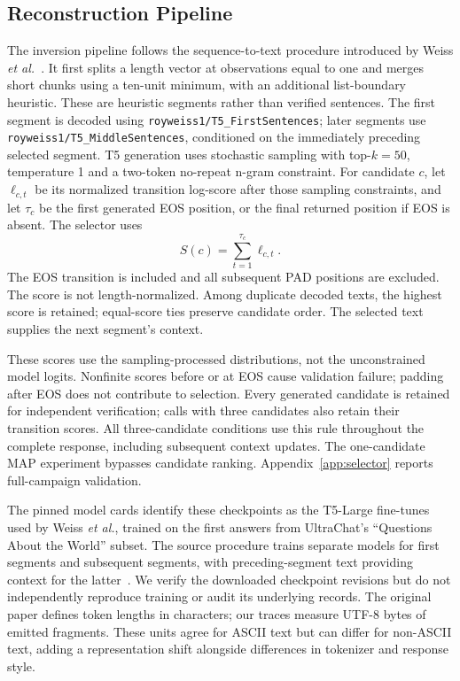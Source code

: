 \documentclass[electronics,article,submit,pdftex,moreauthors]{Definitions/mdpi}
\begin{document}
\subsection{Reconstruction Pipeline}\label{sec:reconstructor}
The inversion pipeline follows the sequence-to-text procedure introduced by Weiss \emph{et al.}~\cite{weiss2024prompt}. It first splits a length vector at observations equal to one and merges short chunks using a ten-unit minimum, with an additional list-boundary heuristic. These are heuristic segments rather than verified sentences. The first segment is decoded using \texttt{royweiss1/T5\_FirstSentences}; later segments use \texttt{royweiss1/T5\_MiddleSentences}, conditioned on the immediately preceding selected segment. T5 generation uses stochastic sampling with top-$k=50$, temperature 1 and a two-token no-repeat n-gram constraint. For candidate $c$, let $\ell_{c,t}$ be its normalized transition log-score after those sampling constraints, and let $\tau_c$ be the first generated EOS position, or the final returned position if EOS is absent. The selector uses
\begin{equation}
S(c)=\sum_{t=1}^{\tau_c}\ell_{c,t}.
\end{equation}
The EOS transition is included and all subsequent PAD positions are excluded. The score is not length-normalized. Among duplicate decoded texts, the highest score is retained; equal-score ties preserve candidate order. The selected text supplies the next segment's context.

These scores use the sampling-processed distributions, not the unconstrained model logits. Nonfinite scores before or at EOS cause validation failure; padding after EOS does not contribute to selection. Every generated candidate is retained for independent verification; calls with three candidates also retain their transition scores. All three-candidate conditions use this rule throughout the complete response, including subsequent context updates. The one-candidate MAP experiment bypasses candidate ranking. Appendix~\ref{app:selector} reports full-campaign validation.

The pinned model cards identify these checkpoints as the T5-Large fine-tunes used by Weiss \emph{et al.}, trained on the first answers from UltraChat's ``Questions About the World'' subset. The source procedure trains separate models for first segments and subsequent segments, with preceding-segment text providing context for the latter~\cite{weiss2024prompt}. We verify the downloaded checkpoint revisions but do not independently reproduce training or audit its underlying records. The original paper defines token lengths in characters; our traces measure UTF-8 bytes of emitted fragments. These units agree for ASCII text but can differ for non-ASCII text, adding a representation shift alongside differences in tokenizer and response style.
\end{document}
